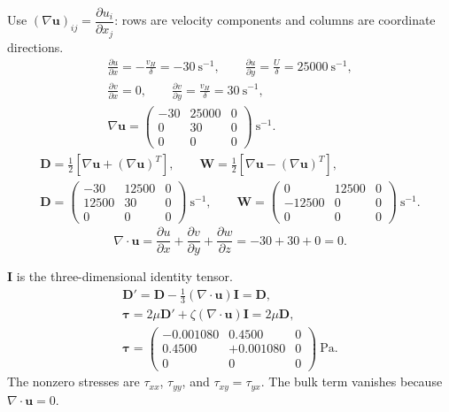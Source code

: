 Use $(\nabla\mathbf u)_{ij}=\dfrac{\partial u_i}{\partial x_j}$:
rows are velocity components and columns are coordinate directions.
\begin{gather*}
\frac{\partial u}{\partial x}=-\frac{v_H}{\delta}=-30~\mathrm{s^{-1}},\qquad
\frac{\partial u}{\partial y}=\frac{U}{\delta}=25000~\mathrm{s^{-1}},\\
\frac{\partial v}{\partial x}=0,\qquad
\frac{\partial v}{\partial y}=\frac{v_H}{\delta}=30~\mathrm{s^{-1}},\\
\boxed{\nabla\mathbf u=
\begin{pmatrix}-30&25000&0\\0&30&0\\0&0&0\end{pmatrix}~\mathrm{s^{-1}}}.
\end{gather*}
\begin{gather*}
\mathbf D=\frac12\left[\nabla\mathbf u+(\nabla\mathbf u)^T\right],\qquad
\mathbf W=\frac12\left[\nabla\mathbf u-(\nabla\mathbf u)^T\right],\\
\boxed{\mathbf D=
\begin{pmatrix}-30&12500&0\\12500&30&0\\0&0&0\end{pmatrix}~\mathrm{s^{-1}}},\qquad
\boxed{\mathbf W=
\begin{pmatrix}0&12500&0\\-12500&0&0\\0&0&0\end{pmatrix}~\mathrm{s^{-1}}}.
\end{gather*}
\[
\boxed{\nabla\cdot\mathbf u
=\frac{\partial u}{\partial x}+\frac{\partial v}{\partial y}
+\frac{\partial w}{\partial z}=-30+30+0=0}.
\]

$\mathbf I$ is the three-dimensional identity tensor.
\begin{gather*}
\mathbf D'=\mathbf D-\frac13(\nabla\cdot\mathbf u)\mathbf I=\mathbf D,\\
\boldsymbol\tau=2\mu\mathbf D'+\zeta(\nabla\cdot\mathbf u)\mathbf I
=2\mu\mathbf D,\\
\boxed{\boldsymbol\tau=
\begin{pmatrix}
-0.001080&0.4500&0\\
0.4500&+0.001080&0\\
0&0&0
\end{pmatrix}~\mathrm{Pa}}.
\end{gather*}
The nonzero stresses are $\tau_{xx}$, $\tau_{yy}$, and $\tau_{xy}=\tau_{yx}$.
The bulk term vanishes because $\nabla\cdot\mathbf u=0$.

